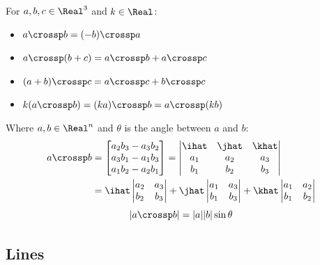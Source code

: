\begin{theorem}
  For $a, b, c \in \Real^3$ and $k \in \Real$:
  \begin{itemize}
    \item $a \crossp b = (-b) \crossp a$
    \item $a \crossp (b + c) = a \crossp b + a \crossp c$
    \item $(a + b) \crossp c = a \crossp c + b \crossp c$
    \item $k(a \crossp b) = (ka) \crossp b = a \crossp (kb)$
  \end{itemize}
\end{theorem}

\begin{theorem}
  Where $a, b \in \Real^n$ and $\theta$ is the angle between $a$ and $b$:
  \begin{align*}
    a \crossp b &= \begin{bmatrix}
      a_2 b_3 - a_3 b_2 \\
      a_3 b_1 - a_1 b_3 \\
      a_1 b_2 - a_2 b_1 \\
    \end{bmatrix} = \begin{vmatrix}
      \ihat & \jhat & \khat \\
      a_1 & a_2 & a_3 \\
      b_1 & b_2 & b_3
    \end{vmatrix} \\
    &= \ihat \begin{vmatrix}
      a_2 & a_3 \\
      b_2 & b_3
    \end{vmatrix}
    + \jhat \begin{vmatrix}
      a_1 & a_3 \\
      b_1 & b_3
    \end{vmatrix}
    + \khat \begin{vmatrix}
      a_1 & a_2 \\
      b_1 & b_2
    \end{vmatrix}
  \end{align*}
  \[
    |a \crossp b| = |a| |b| \sin \theta
  \]
\end{theorem}

\subsection{Lines}

